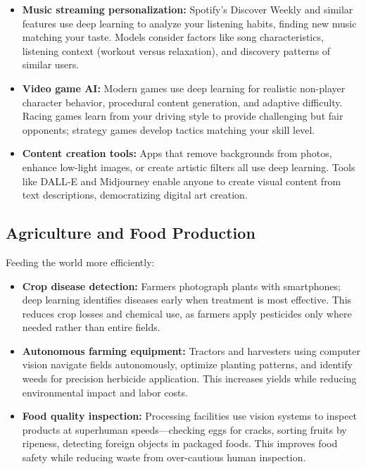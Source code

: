 \begin{itemize}
    \item \textbf{Music streaming personalization:} Spotify's Discover Weekly and similar features use deep learning to analyze your listening habits, finding new music matching your taste. Models consider factors like song characteristics, listening context (workout versus relaxation), and discovery patterns of similar users.
    
    \item \textbf{Video game AI:} Modern games use deep learning for realistic non-player character behavior, procedural content generation, and adaptive difficulty. Racing games learn from your driving style to provide challenging but fair opponents; strategy games develop tactics matching your skill level.
    
    \item \textbf{Content creation tools:} Apps that remove backgrounds from photos, enhance low-light images, or create artistic filters all use deep learning. Tools like DALL-E and Midjourney enable anyone to create visual content from text descriptions, democratizing digital art creation.
\end{itemize}

\subsection{Agriculture and Food Production}

Feeding the world more efficiently:

\begin{itemize}
    \item \textbf{Crop disease detection:} Farmers photograph plants with smartphones; deep learning identifies diseases early when treatment is most effective. This reduces crop losses and chemical use, as farmers apply pesticides only where needed rather than entire fields.
    
    \item \textbf{Autonomous farming equipment:} Tractors and harvesters using computer vision navigate fields autonomously, optimize planting patterns, and identify weeds for precision herbicide application. This increases yields while reducing environmental impact and labor costs.
    
    \item \textbf{Food quality inspection:} Processing facilities use vision systems to inspect products at superhuman speeds—checking eggs for cracks, sorting fruits by ripeness, detecting foreign objects in packaged foods. This improves food safety while reducing waste from over-cautious human inspection.
\end{itemize}


